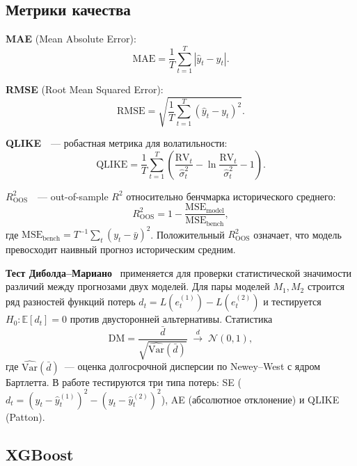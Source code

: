 \subsection{Метрики качества}

\textbf{MAE} (Mean Absolute Error):
\begin{equation}
    \mathrm{MAE} = \frac{1}{T}\sum_{t=1}^{T} |\hat{y}_t - y_t|.
\end{equation}

\textbf{RMSE} (Root Mean Squared Error):
\begin{equation}
    \mathrm{RMSE} = \sqrt{\frac{1}{T}\sum_{t=1}^{T}(\hat{y}_t - y_t)^2}.
\end{equation}

\textbf{QLIKE}~\cite{Patton2011}~--- робастная метрика для волатильности:
\begin{equation}
    \mathrm{QLIKE} = \frac{1}{T}\sum_{t=1}^{T}
    \left(\frac{\mathrm{RV}_t}{\hat{\sigma}_t^2}
    - \ln\frac{\mathrm{RV}_t}{\hat{\sigma}_t^2} - 1\right).
\end{equation}

\textbf{$R^2_{\mathrm{OOS}}$}~\cite{GoyalWelch2008}~---
out-of-sample $R^2$ относительно бенчмарка исторического среднего:
\begin{equation}
    R^2_{\mathrm{OOS}} = 1 - \frac{\mathrm{MSE}_{\text{model}}}{\mathrm{MSE}_{\text{bench}}},
\end{equation}
где $\mathrm{MSE}_{\text{bench}} = T^{-1}\sum_t(y_t - \bar{y})^2$.
Положительный $R^2_{\mathrm{OOS}}$ означает, что модель превосходит
наивный прогноз историческим средним.

\textbf{Тест Диболда--Мариано}~\cite{Diebold1995} применяется для проверки
статистической значимости различий между прогнозами двух моделей.
Для пары моделей $M_1, M_2$ строится ряд разностей функций потерь
$d_t = L(e_t^{(1)}) - L(e_t^{(2)})$ и тестируется
$H_0: \mathbb{E}[d_t] = 0$ против двусторонней альтернативы.
Статистика
\begin{equation}
    \mathrm{DM} = \frac{\bar{d}}{\sqrt{\widehat{\mathrm{Var}}(\bar{d})}}
    \;\xrightarrow{d}\; \mathcal{N}(0, 1),
\end{equation}
где $\widehat{\mathrm{Var}}(\bar{d})$~--- оценка долгосрочной дисперсии
по Newey--West с ядром Бартлетта. В работе тестируются три типа потерь:
SE ($d_t = (y_t-\hat{y}^{(1)}_t)^2 - (y_t-\hat{y}^{(2)}_t)^2$),
AE (абсолютное отклонение) и QLIKE (Patton).

\subsection{XGBoost}

